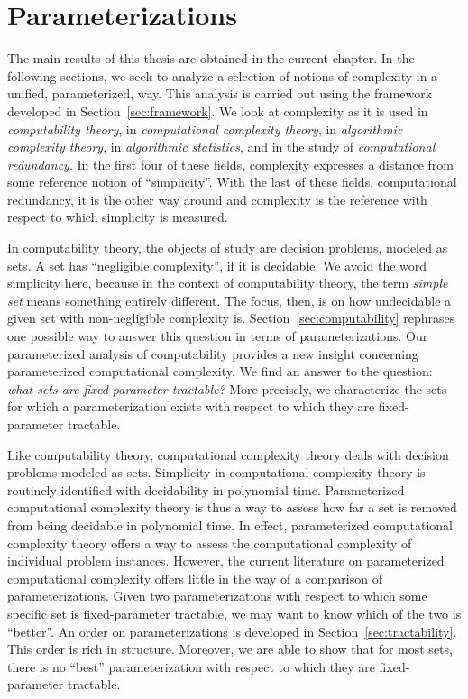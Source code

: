 \chapter{Parameterizations}
\label{ch:parameterizations}%

The main results of this thesis are obtained in the current chapter.
In the following sections, we seek to analyze a selection of notions of complexity in a unified, parameterized, way.
This analysis is carried out using the framework developed in Section~\ref{sec:framework}.
We look at complexity as it is used in \emph{computability theory}, in \emph{computational complexity theory}, in \emph{algorithmic complexity theory}, in \emph{algorithmic statistics}, and in the study of \emph{computational redundancy}.
In the first four of these fields, complexity expresses a distance from some reference notion of \enquote{simplicity}.
With the last of these fields, computational redundancy, it is the other way around and complexity is the reference with respect to which simplicity is measured.

In computability theory, the objects of study are decision problems, modeled as sets.
A set has \enquote{negligible complexity}, if it is decidable.
We avoid the word simplicity here, because in the context of computability theory, the term \emph{simple set} means something entirely different.
The focus, then, is on how undecidable a given set with non-negligible complexity is.
Section~\ref{sec:computability} rephrases one possible way to answer this question in terms of parameterizations.
Our parameterized analysis of computability provides a new insight concerning parameterized computational complexity.
We find an answer to the question: \emph{what sets are fixed-parameter tractable?}
More precisely, we characterize the sets for which a parameterization exists with respect to which they are fixed-parameter tractable.

Like computability theory, computational complexity theory deals with decision problems modeled as sets.
Simplicity in computational complexity theory is routinely identified with decidability in polynomial time.
Parameterized computational complexity theory is thus a way to assess how far a set is removed from being decidable in polynomial time.
In effect, parameterized computational complexity theory offers a way to assess the computational complexity of individual problem instances.
However, the current literature on parameterized computational complexity offers little in the way of a comparison of parameterizations.
Given two parameterizations with respect to which some specific set is fixed-parameter tractable, we may want to know which of the two is \enquote{better}.
An order on parameterizations is developed in Section~\ref{sec:tractability}.
This order is rich in structure.
Moreover, we are able to show that for most sets, there is no \enquote{best} parameterization with respect to which they are fixed-parameter tractable.

